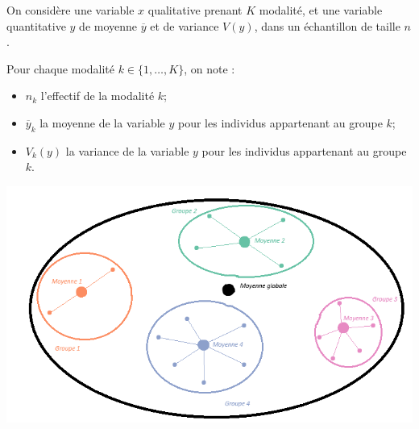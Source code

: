\documentclass[aspectratio=169,xcolor=dvipsnames]{beamer}
\begin{document}
\begin{frame}

\vfill

\textcolor{nyubluedarker}{\faCogs} On considère une variable $x$ qualitative prenant $K$ modalité, et une variable quantitative $y$ de moyenne $\overline{y}$ et de variance $V(y)$, dans un échantillon de taille $n$.

\medskip

\textcolor{nyubluedarker}{\faCogs} Pour chaque modalité $k \in \{1,\ldots , K\}$, on note :
	\begin{itemize}
	\item $n_k$ l'effectif de la modalité $k$;
	\item $\overline{y}_k$ la moyenne de la variable $y$ pour les individus appartenant au groupe $k$;
	\item $V_k(y)$ la variance de la variable $y$ pour les individus appartenant au groupe $k$.
	\end{itemize}	
	
	\begin{center}
	\includegraphics[scale=0.4]{pres_var.png}
	\end{center}
	
	\vfill
	
\end{frame}
\end{document}
